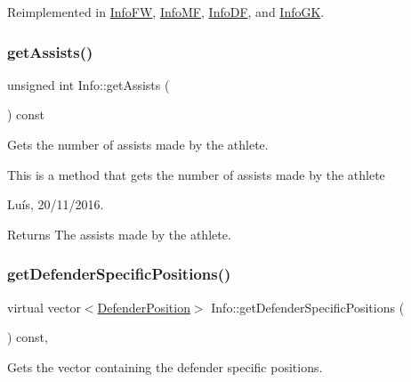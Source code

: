 Reimplemented in \hyperlink{class_info_f_w_a4c5957205aa850fcdc1d6ba30f085543}{Info\+FW}, \hyperlink{class_info_m_f_ac61b01c6bfed2c31bd4ddbc2baba097d}{Info\+MF}, \hyperlink{class_info_d_f_a036c0f0898331e092f913da788b7ccdb}{Info\+DF}, and \hyperlink{class_info_g_k_a7bdc5a14f105385b4d856c8df7a4c7d0}{Info\+GK}.

\hypertarget{class_info_a38bd3c4f89a9b2f6d57ff7c3b7efa2ea}{}\label{class_info_a38bd3c4f89a9b2f6d57ff7c3b7efa2ea} 
\subsubsection{\texorpdfstring{get\+Assists()}{getAssists()}}
{\footnotesize\ttfamily unsigned int Info\+::get\+Assists (\begin{DoxyParamCaption}{ }\end{DoxyParamCaption}) const}



Gets the number of assists made by the athlete. 

This is a method that gets the number of assists made by the athlete

Luís, 20/11/2016. 

\begin{DoxyReturn}{Returns}
The assists made by the athlete. 
\end{DoxyReturn}
\hypertarget{class_info_afa64d6a602f80674209e3391bf5fa309}{}\label{class_info_afa64d6a602f80674209e3391bf5fa309} 
\subsubsection{\texorpdfstring{get\+Defender\+Specific\+Positions()}{getDefenderSpecificPositions()}}
{\footnotesize\ttfamily virtual vector$<$\hyperlink{_utils_8hpp_a94ee089ecd5db12c81c7edbefaabff4d}{Defender\+Position}$>$ Info\+::get\+Defender\+Specific\+Positions (\begin{DoxyParamCaption}{ }\end{DoxyParamCaption}) const\hspace{0.3cm}{\ttfamily [inline]}, {\ttfamily [virtual]}}



Gets the vector containing the defender specific positions. 

